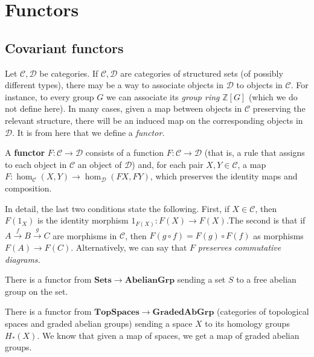 \section{Functors}

\subsection{Covariant functors}
Let $\mathcal{C}, \mathcal{D}$ be categories. If $\mathcal{C}, \mathcal{D}$
are categories of structured sets (of possibly different types), there may be a
way to associate objects in $\mathcal{D}$ to objects in $\mathcal{C}$. For
instance, to every group $G$ we can associate its \emph{group ring}
$\mathbb{Z}[G]$
 (which we do not define here).
In many cases, given a map between objects in $\mathcal{C}$ preserving the
relevant structure, there will be an induced map on the corresponding objects
in $\mathcal{D}$. It is from here that we define a \emph{functor.}

\begin{definition}
A \textbf{functor} $F: \mathcal{C} \to \mathcal{D}$ consists of a function $F:
\mathcal{C} \to  \mathcal{D}$ (that is, a rule that assigns to each object
in $\mathcal{C}$ an object of $\mathcal{D}$) and, for each pair $X, Y \in
\mathcal{C}$,
a map
$F: \hom_{\mathcal{C}}(X, Y) \to \hom_{\mathcal{D}}(FX, FY)$, which preserves
the identity
maps and composition.
\end{definition}

In detail, the last two conditions state the following. First, if $X \in
\mathcal{C}$, then $F(1_X)$ is the identity morphism $1_{F(X)}: F(X) \to
F(X)$.The second is that if $A \stackrel{f}{\to} B \stackrel{g}{\to} C$ are
morphisms in $\mathcal{C}$,
then $F(g \circ f) = F(g) \circ F(f)$ as morphisms $F(A) \to F(C)$.
Alternatively, we can say that $F$ \emph{preserves commutative diagrams.}

\begin{example}
There is a functor from $\mathbf{Sets} \to \mathbf{AbelianGrp}$ sending a set
$S$ to a free abelian group on the set.
\end{example}

\begin{example}
There is a functor from $\mathbf{TopSpaces} \to \mathbf{GradedAbGrp}$
(categories of topological spaces and graded abelian groups) sending a
space $X$ to its homology groups $H_*(X)$. We know that given a map of spaces,
we get a map of graded abelian groups.
\end{example}

